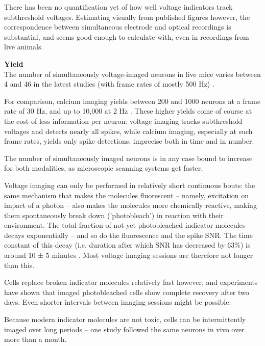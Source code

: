 There has been no quantification yet of how well voltage indicators track subthreshold voltages. Estimating visually from published figures however, the correspondence between simultaneous electrode and optical recordings is substantial, and seems good enough to calculate with, even in recordings from live animals.


\textbf{Yield}\\
The number of simultaneously voltage-imaged neurons in live mice varies between 4 and 46 in the latest studies (with frame rates of mostly 500 Hz) \cite{Adam2019VoltageImagingOptogenetics,Villette2019UltrafastTwoPhotonImaging,Abdelfattah2019BrightPhotostableChemigenetic,Piatkevich2019PopulationImagingNeural}.

For comparison, calcium imaging yields between 200 and 1000 neurons at a frame rate of 30 Hz, and up to 10,000 at 2 Hz \cite{Pachitariu2017Suite2p10000}. These higher yields come of course at the cost of less information per neuron: voltage imaging tracks subthreshold voltages and detects nearly all spikes, while calcium imaging, especially at such frame rates, yields only spike detections, imprecise both in time and in number.

The number of simultaneously imaged neurons is in any case bound to increase for both modalities, as microscopic scanning systems get faster.

Voltage imaging can only be performed in relatively short continuous bouts: the same mechanism that makes the molecules fluorescent -- namely, excitation on impact of a photon -- also makes the molecules more chemically reactive, making them spontaneously break down ('photobleach') in reaction with their environment. The total fraction of not-yet photobleached indicator molecules decays exponentially -- and so do the fluorescence and the spike SNR. The time constant of this decay (i.e. duration after which SNR has decreased by 63\%) is around 10 ± 5 minutes \cite{Piatkevich2019PopulationImagingNeural,Abdelfattah2019BrightPhotostableChemigenetic}. Most voltage imaging sessions are therefore not longer than this.

Cells replace broken indicator molecules relatively fast however, and experiments have shown that imaged photobleached cells show complete recovery after two days. Even shorter intervals between imaging sessions might be possible.

Because modern indicator molecules are not toxic, cells can be intermittently imaged over long periods -- one study followed the same neurons in vivo over more than a month.




